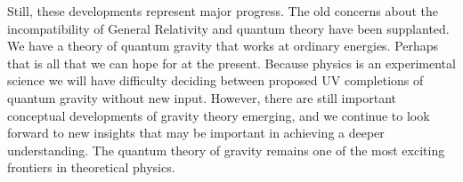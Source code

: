 \documentclass[12pt]{article}
\begin{document}
Still, these developments represent major progress. The old concerns about the incompatibility of General Relativity and quantum theory have been supplanted.   We have a theory of quantum gravity that works at ordinary energies. Perhaps that is all that we can hope for at the present. Because physics is an experimental science we will have difficulty deciding between proposed UV completions of quantum gravity without new input. However, there are still important conceptual developments of gravity theory emerging, and we continue to look forward to new insights that may be important in achieving a deeper understanding. The quantum theory of gravity remains one of the most exciting frontiers in theoretical physics.





\end{document}
